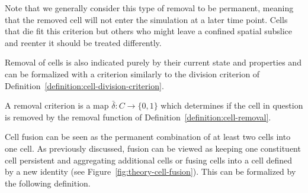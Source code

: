 Note that we generally consider this type of removal to be permanent, meaning that the removed cell
will not enter the simulation at a later time point.
Cells that die fit this criterion but others who might leave a confined spatial subslice and reenter
it should be treated differently.

Removal of cells is also indicated purely by their current state and properties and can be
formalized with a criterion similarly to the division criterion of
Definition~\ref{definition:cell-division-criterion}.

\begin{definition}
    A removal criterion is a map $\bar{\delta}:C\rightarrow\{0,1\}$ which determines if the cell in
    question is removed by the removal function of Definition~\ref{definition:cell-removal}.
    \label{definition:cell-removal-criterion}
\end{definition}

Cell fusion can be seen as the permanent combination of at least two cells into one cell.
As previously discussed, fusion can be viewed as keeping one constituent cell persistent and
aggregating additional cells or fusing cells into a cell defined by a new identity (see
Figure~\ref{fig:theory-cell-fusion}).
This can be formalized by the following definition.

